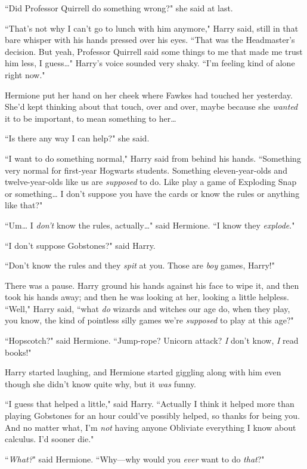 ``Did Professor Quirrell do something wrong?" she said at last.

``That's not why I can't go to lunch with him anymore," Harry said, still in that bare whisper with his hands pressed over his eyes. ``That was the Headmaster's decision. But yeah, Professor Quirrell said some things to me that made me trust him less, I guess{\ldots}" Harry's voice sounded very shaky. ``I'm feeling kind of alone right now."

Hermione put her hand on her cheek where Fawkes had touched her yesterday. She'd kept thinking about that touch, over and over, maybe because she \emph{wanted} it to be important, to mean something to her{\ldots}

``Is there any way I can help?" she said.

``I want to do something normal," Harry said from behind his hands. ``Something very normal for first-year Hogwarts students. Something eleven-year-olds and twelve-year-olds like us are \emph{supposed} to do. Like play a game of Exploding Snap or something{\ldots} I don't suppose you have the cards or know the rules or anything like that?"

``Um{\ldots} I \emph{don't} know the rules, actually{\ldots}" said Hermione. ``I know they \emph{explode}."

``I don't suppose Gobstones?" said Harry.

``Don't know the rules and they \emph{spit} at you. Those are \emph{boy} games, Harry!"

There was a pause. Harry ground his hands against his face to wipe it, and then took his hands away; and then he was looking at her, looking a little helpless. ``Well," Harry said, ``what \emph{do} wizards and witches our age do, when they play, you know, the kind of pointless silly games we're \emph{supposed} to play at this age?"

``Hopscotch?" said Hermione. ``Jump-rope? Unicorn attack? \emph{I} don't know, \emph{I} read books!"

Harry started laughing, and Hermione started giggling along with him even though she didn't know quite why, but it \emph{was} funny.

``I guess that helped a little," said Harry. ``Actually I think it helped more than playing Gobstones for an hour could've possibly helped, so thanks for being you. And no matter what, I'm \emph{not} having anyone Obliviate everything I know about calculus. I'd sooner die."

``\emph{What?}" said Hermione. ``Why—why would you \emph{ever} want to do \emph{that}?"

